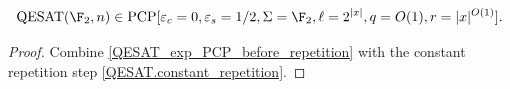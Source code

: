 \begin{theorem}
\label{QESAT_exp_PCP}
\leanok
\[
  \mathrm{QESAT}(\F_2,n) \in
  \mathrm{PCP}[
    \varepsilon_c = 0,
    \varepsilon_s = 1/2,
    \Sigma = \F_2,
    \ell = 2^{|x|},
    q = O(1),
    r = |x|^{O(1)}
  ].
\]
\end{theorem}
\begin{proof}\leanok
Combine \ref{QESAT_exp_PCP_before_repetition} with the constant repetition
step \ref{QESAT.constant_repetition}.
\end{proof}

